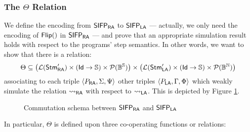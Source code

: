 \subsubsection{The $\Theta$ Relation}
\label{subsub:thetarelation}
We define the encoding from
$\mathsf{SIFP}_{\mathsf{RA}}$ to $\mathsf{SIFP}_{\mathsf{LA}}$
--- actually, we only need the encoding of $\mathsf{Flip(}\mathsf{)}$ in $\mathsf{SIFP}_{\mathsf{RA}}$ ---
and prove that an appropriate simulation result holds with respect to
the programs' step semantics.
%
In other words, we want to show that there is a relation:
%
$$
\Theta\subseteq \left({\mathcal L ({\mathsf{Stm}_{\mathsf{RA}}'})}\times \left(\mathsf{Id}\to{\mathbb{S}}\right)\times \mathcal P (\mathbb{B}^{\mathbb{S}}) \right)
\times
\left({\mathcal L ({\mathsf{Stm}_{\mathsf{LA}}'})}\times \left(\mathsf{Id}\to{\mathbb{S}}\right)\times \mathcal P (\mathbb{B}^{\mathbb{N}}) \right)
$$
%
associating to each triple $\langle P_{\mathsf{RA}}, \Sigma, \Psi\rangle$ other triples
$\langle P_{\mathsf{LA}}, \Gamma, \Phi\rangle$ which weakly simulate the relation ${\leadsto_{\mathsf{RA}}}$
with respect to ${\leadsto_{\mathsf{LA}}}$. This is depicted by Figure \ref{fig:commutationsifp}.
%
\begin{figure}[]
  \centering
  \caption{Commutation schema between $\mathsf{SIFP_{{\mathsf{RA}}}}$ and $\mathsf{SIFP_{{\mathsf{LA}}}}$}
  \label{fig:commutationsifp}
\end{figure}
%
In particular, $\Theta$ is defined upon three co-operating functions or relations:
%
